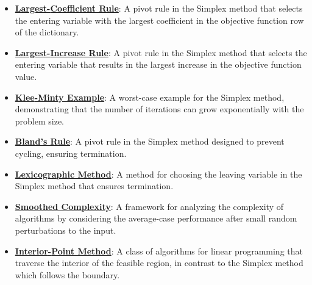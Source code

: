 \documentclass{article}%
\begin{document}
\begin{itemize}[leftmargin=*]%
\item \href{https://www.math.purdue.edu/~yipn/421/2024-09-05-SimplexEfficiency.pdf#page=4}{\textbf{Largest{-}Coefficient Rule}}: A pivot rule in the Simplex method that selects the entering variable with the largest coefficient in the objective function row of the dictionary.%
\item \href{https://www.math.purdue.edu/~yipn/421/2024-09-05-SimplexEfficiency.pdf#page=6}{\textbf{Largest{-}Increase Rule}}: A pivot rule in the Simplex method that selects the entering variable that results in the largest increase in the objective function value.%
\item \href{https://www.math.purdue.edu/~yipn/421/2024-09-05-SimplexEfficiency.pdf#page=2}{\textbf{Klee{-}Minty Example}}: A worst-case example for the Simplex method, demonstrating that the number of iterations can grow exponentially with the problem size.%
\item \href{https://www.math.purdue.edu/~yipn/421/2024-09-05-SimplexEfficiency.pdf#page=10}{\textbf{Bland's Rule}}: A pivot rule in the Simplex method designed to prevent cycling, ensuring termination.%
\item \href{https://www.math.purdue.edu/~yipn/421/2024-09-05-SimplexEfficiency.pdf#page=10}{\textbf{Lexicographic Method}}: A method for choosing the leaving variable in the Simplex method that ensures termination.%
\item \href{https://www.math.purdue.edu/~yipn/421/2024-09-05-SimplexEfficiency.pdf#page=11}{\textbf{Smoothed Complexity}}: A framework for analyzing the complexity of algorithms by considering the average-case performance after small random perturbations to the input.%
\item \href{https://www.math.purdue.edu/~yipn/421/2024-09-05-SimplexEfficiency.pdf#page=12}{\textbf{Interior{-}Point Method}}: A class of algorithms for linear programming that traverse the interior of the feasible region, in contrast to the Simplex method which follows the boundary.%
\end{itemize}%
\end{document}
